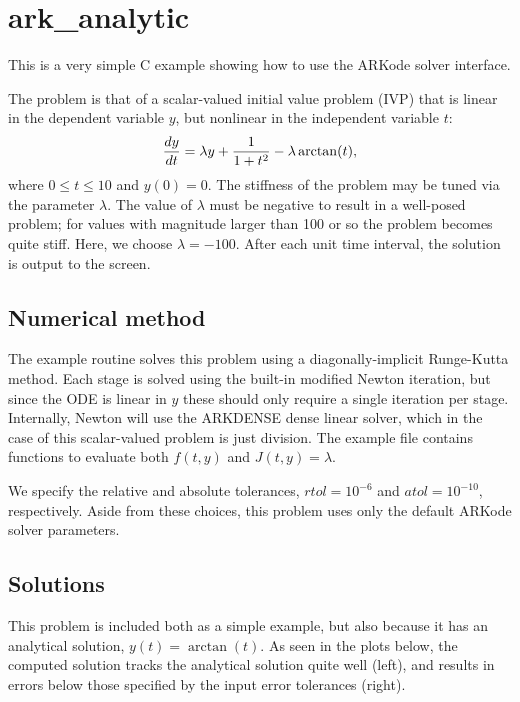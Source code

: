 \documentclass[letterpaper,10pt,english]{sphinxmanual}
\begin{document}
\section{ark\_analytic}
\label{c_serial:ark-analytic}\label{c_serial:id1}
This is a very simple C example showing how to use the ARKode solver
interface.

The problem is that of a scalar-valued initial value problem (IVP)
that is linear in the dependent variable $y$, but nonlinear in
the independent variable $t$:
\begin{gather}
\begin{split}\frac{dy}{dt} = \lambda y + \frac{1}{1+t^2} - \lambda \arctan(t),\end{split}\notag
\end{gather}
where $0\le t\le 10$ and $y(0)=0$.  The stiffness of the
problem may be tuned via the parameter $\lambda$.  The value of
$\lambda$ must be negative to result in a well-posed problem;
for values with magnitude larger than 100 or so the problem becomes
quite stiff.  Here, we choose $\lambda=-100$.  After each unit
time interval, the solution is output to the screen.


\subsection{Numerical method}
\label{c_serial:numerical-method}
The example routine solves this problem using a diagonally-implicit
Runge-Kutta method.  Each stage is solved using the built-in modified
Newton iteration, but since the ODE is linear in $y$ these
should only require a single iteration per stage.  Internally, Newton
will use the ARKDENSE dense linear solver, which in the case of this
scalar-valued problem is just division.  The example file contains
functions to evaluate both $f(t,y)$ and $J(t,y)=\lambda$.

We specify the relative and absolute tolerances, $rtol=10^{-6}$
and $atol=10^{-10}$, respectively.  Aside from these choices,
this problem uses only the default ARKode solver parameters.


\subsection{Solutions}
\label{c_serial:solutions}
This problem is included both as a simple example, but also because it
has an analytical solution, $y(t) = \arctan(t)$.  As seen in the
plots below, the computed solution tracks the analytical solution
quite well (left), and results in errors below those specified by the input
error tolerances (right).
\end{document}

